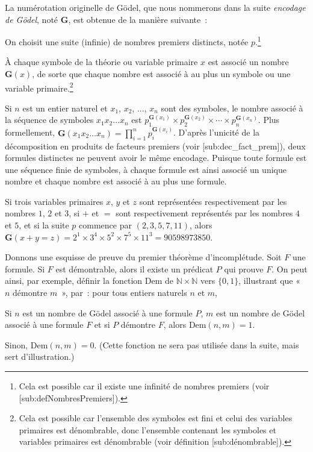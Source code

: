 La numérotation originelle de Gödel, que nous nommerons dans la suite \emph{encodage de Gödel}, noté $\mathbf{G}$, est obtenue de la manière suivante : 
\startitemize[nowhite]
  \item On choisit une suite (infinie) de nombres premiers distincts, notée $p$.\footnote{Cela est possible car il existe une infinité de nombres premiers (voir [sub:defNombresPremiers]).}
  \item À chaque symbole de la théorie ou variable primaire $x$ est associé un nombre $\mathbf{G}(x)$, de sorte que chaque nombre est associé à au plus un symbole ou une variable primaire.\footnote{Cela est possible car l'ensemble des symboles est fini et celui des variables primaires est dénombrable, donc l'ensemble contenant les symboles et variables primaires est dénombrable (voir définition [sub:dénombrable]).}
  \item Si $n$ est un entier naturel et $x_1$, $x_2$, ..., $x_n$ sont des symboles, le nombre associé à la séquence de symboles $x_1 x_2 \dots x_n$ est $p_1^{\mathbf{G}(x_1)} \times p_2^{\mathbf{G}(x_2)} \times \cdots \times p_n^{\mathbf{G}(x_n)}$.
    Plus formellement, $\mathbf{G}(x_1 x_2 \dots x_n) = \prod_{i=1}^n p_i^{\mathbf{G}(x_i)}$. 
\stopitemize
D'après l'unicité de la décomposition en produits de facteurs premiers (voir [sub:dec_fact_prem]), deux formules distinctes ne peuvent avoir le même encodage.
Puisque toute formule est une séquence finie de symboles, à chaque formule est ainsi associé un unique nombre et chaque nombre est associé à au plus une formule.

\blank[medium]

\noindent {} Si trois variables primaires $x$, $y$ et $z$ sont représentées respectivement par les nombres $1$, $2$ et $3$, si $+$ et $=$ sont respectivement représentés par les nombres $4$ et $5$, et si la suite $p$ commence par $(2, 3, 5, 7, 11)$, alors $\mathbf{G}(x + y = z) = 2^1 \times 3^4 \times 5^2 \times 7^5 \times 11^3 = 90598973850$.

\blank[medium]

\noindent Donnons une esquisse de preuve du premier théorème d'incomplétude.
Soit $F$ une formule. 
Si $F$ est démontrable, alors il existe un prédicat $P$ qui prouve $F$. 
On peut ainsi, par exemple, définir la fonction $\mathrm{Dem}$ de $\mathbb{N} \times \mathbb{N}$ vers $\lbrace 0, 1 \rbrace$, illustrant que « $n$ démontre $m$ », par : pour tous entiers naturels $n$ et $m$, 
\startitemize[nowhite]
  \item Si $n$ est un nombre de Gödel associé à une formule $P$, $m$ est un nombre de Gödel associé à une formule $F$ et si $P$ démontre $F$, alors $\mathrm{Dem}(n, m) = 1$.
  \item Sinon, $\mathrm{Dem}(n, m) = 0$. 
\stopitemize
(Cette fonction ne sera pas utilisée dans la suite, mais sert d'illustration.)

